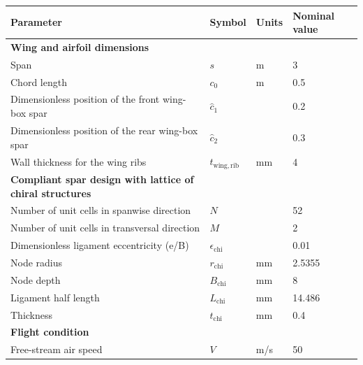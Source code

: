     \begin{table}[!htpb]
      \centering
      \begin{tabular}{|l|lll|}
      \hline
      \textbf{Parameter} & \multicolumn{1}{l|}{\textbf{Symbol}} & \multicolumn{1}{l|}{\textbf{Units}} & \textbf{Nominal value} \\ \hline \hline
      {\textbf{Wing and airfoil dimensions}} &  &  &  \\ \hline
      Span & \multicolumn{1}{l|}{$s$} & \multicolumn{1}{l|}{m} & 3 \\ \hline
      Chord length & \multicolumn{1}{l|}{$c_0$} & \multicolumn{1}{l|}{m} & 0.5 \\ \hline
      Dimensionless position of the front wing-box spar & \multicolumn{1}{l|}{$\hat{c}_1$} & \multicolumn{1}{l|}{} & 0.2 \\ \hline
      Dimensionless position of the rear wing-box spar & \multicolumn{1}{l|}{$\hat{c}_2$} & \multicolumn{1}{l|}{} & 0.3 \\ \hline
      Wall thickness for the wing ribs & \multicolumn{1}{l|}{$t_{\mathrm{wing,rib}}$} & \multicolumn{1}{l|}{mm} & 4 \\ \hline \hline
      {\textbf{Compliant spar design with lattice of chiral structures}} &  &  &  \\ \hline
      Number of unit cells in spanwise direction & \multicolumn{1}{l|}{$N$} & \multicolumn{1}{l|}{} & 52 \\ \hline
      Number of unit cells in transversal direction & \multicolumn{1}{l|}{$M$} & \multicolumn{1}{l|}{} & 2 \\ \hline
      Dimensionless ligament eccentricity (e/B) & \multicolumn{1}{l|}{$\epsilon_{\mathrm{chi}}$} & \multicolumn{1}{l|}{} & 0.01 \\ \hline
      Node radius & \multicolumn{1}{l|}{$r_{\mathrm{chi}}$} & \multicolumn{1}{l|}{mm} & 2.5355 \\ \hline
      Node depth & \multicolumn{1}{l|}{$B_{\mathrm{chi}}$} & \multicolumn{1}{l|}{mm} & 8 \\ \hline
      Ligament half length & \multicolumn{1}{l|}{$L_{\mathrm{chi}}$} & \multicolumn{1}{l|}{mm} & 14.486 \\ \hline
      Thickness & \multicolumn{1}{l|}{$t_{\mathrm{chi}}$} & \multicolumn{1}{l|}{mm} & 0.4 \\ \hline \hline
      {\textbf{Flight condition}} &  &  &  \\ \hline
      Free-stream air speed & \multicolumn{1}{l|}{$V$} & \multicolumn{1}{l|}{m/s} & 50 \\ \hline

\end{tabular}
\end{table}
